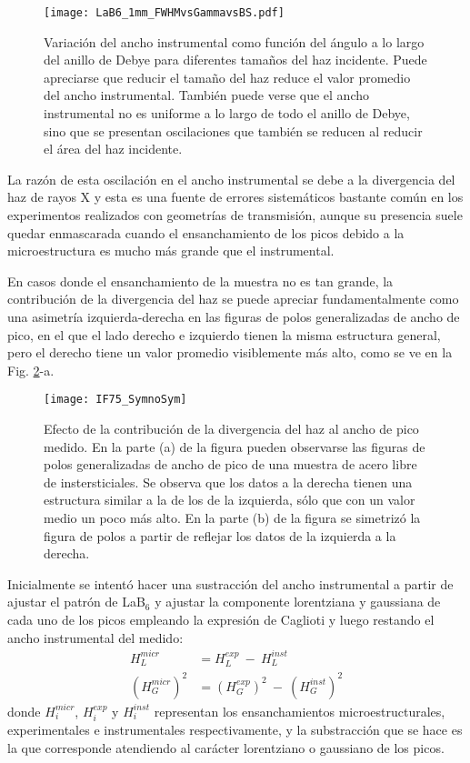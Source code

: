 \begin{figure}[!htb]
  \centering
  \texttt{[image: LaB6\_1mm\_FWHMvsGammavsBS.pdf]}
  \caption{Variación del ancho instrumental como función del ángulo a lo largo del anillo de Debye para diferentes tamaños del haz incidente. Puede apreciarse que reducir el tamaño del haz reduce el valor promedio del ancho instrumental. También puede verse que el ancho instrumental no es uniforme a lo largo de todo el anillo de Debye, sino que se presentan oscilaciones que también se reducen al reducir el área del haz incidente.}
  \label{fig:LaB6vsGamma}
\end{figure}

La razón de esta oscilación en el ancho instrumental se debe a la divergencia del haz de rayos X\cite{Wcislak2002} y esta es una fuente de errores sistemáticos bastante común en los experimentos realizados con geometrías de transmisión, aunque su presencia suele quedar enmascarada cuando el ensanchamiento de los picos debido a la microestructura es mucho más grande que el instrumental.

En casos donde el ensanchamiento de la muestra no es tan grande, la contribución de la divergencia del haz se puede apreciar fundamentalmente como una asimetría izquierda-derecha en las figuras de polos generalizadas de ancho de pico, en el que el lado derecho e izquierdo tienen la misma estructura general, pero el derecho tiene un valor promedio visiblemente más alto, como se ve en la Fig. \ref{fig:IF75NoSym}-a.

\begin{figure}[!htb] 
  \centering
  \texttt{[image: IF75\_SymnoSym]}
  \caption{Efecto de la contribución de la divergencia del haz al ancho de pico medido. En la parte (a) de la figura pueden observarse las figuras de polos generalizadas de ancho de pico de una muestra de acero libre de instersticiales. Se observa que los datos a la derecha tienen una estructura similar a la de los de la izquierda, sólo que con un valor medio un poco más alto. En la parte (b) de la figura se simetrizó la figura de polos a partir de reflejar los datos de la izquierda a la derecha.}
  \label{fig:IF75NoSym}
\end{figure}

Inicialmente se intentó hacer una sustracción del ancho instrumental a partir de ajustar el patrón de LaB$_6$ y ajustar la componente lorentziana y gaussiana de cada uno de los picos empleando la expresión de Caglioti\cite{Caglioti1958} y luego restando el ancho instrumental del medido:
\begin{align}
  H_L^{micr} & = H_L^{exp} \ - \ H_L^{inst} \nonumber \\
  (H_G^{micr})^2 & = (H_G^{exp})^2 \ - \ (H_G^{inst})^2 
  \label{eq:instrumental}
\end{align}
\noindent
donde $H_i^{micr}$, $H_i^{exp}$ y $H_i^{inst}$ representan los ensanchamientos microestructurales, experimentales e instrumentales respectivamente, y la substracción que se hace es la que corresponde atendiendo al carácter lorentziano o gaussiano de los picos.



